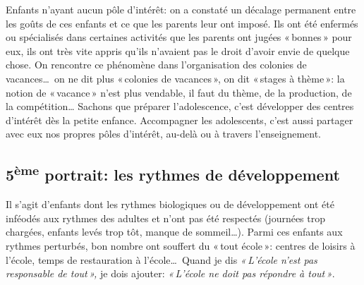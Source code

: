 \documentclass[11pt]{article} %
\begin{document}
  Enfants n'ayant aucun pôle d'intérêt: on a constaté un décalage permanent entre les goûts de ces enfants et ce que les parents leur ont imposé. Ils ont été enfermés ou spécialisés dans certaines activités que les parents ont jugées « bonnes » pour eux, ils ont très vite appris qu'ils n'avaient pas le droit d'avoir envie de quelque chose.\newline
  On rencontre ce phénomène dans l'organisation des colonies de vacances\dots\ on ne dit plus « colonies de vacances », on dit « stages à thème »: la notion de « vacance » n'est plus vendable, il faut du thème, de la production, de la compétition\dots\newline
  Sachons que préparer l'adolescence, c'est développer des centres d'intérêt dès la petite enfance. Accompagner les adolescents, c'est aussi partager avec eux nos propres pôles d'intérêt, au-delà ou à travers l'enseignement.

\subsection{5\textsuperscript{ème} portrait: les rythmes de développement }

  Il s'agit d'enfants dont les rythmes biologiques ou de développement ont été inféodés aux rythmes des adultes et n'ont pas été respectés (journées trop chargées, enfants levés trop tôt, manque de sommeil\dots).\newline
  Parmi ces enfants aux rythmes perturbés, bon nombre ont souffert du « tout école »: centres de loisirs à l'école, temps de restauration à l'école\dots\ Quand je dis \textit{« L'école n'est pas responsable de tout », }je dois ajouter: \textit{« L'école ne doit pas répondre à tout »}.
\end{document}
